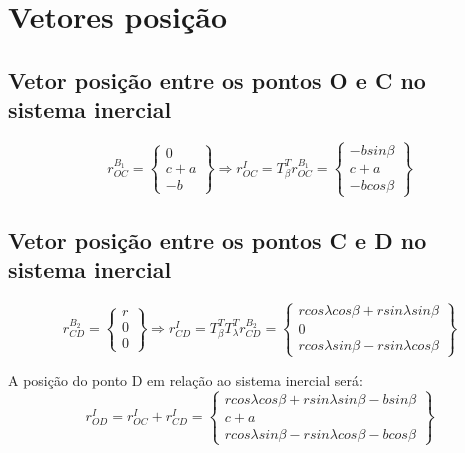 \documentclass[a4paper, 12pt]{article}
\begin{document}
\section{Vetores posição}
	\subsection{Vetor posição entre os pontos O e C no sistema inercial}
		\begin{equation}
			r^{B_1}_{OC} = \begin{Bmatrix}
			0\\
			c + a\\
			-b 
			\end{Bmatrix}
			\Rightarrow
			r^I_{OC} = T_\beta^T r^{B_1}_{OC} = 
			\begin{Bmatrix}
				-bsin\beta\\
				c+a\\
				-bcos\beta
			\end{Bmatrix}
		\end{equation}

	\subsection{Vetor posição entre os pontos C e D no sistema inercial}
		\begin{equation}
			r^{B_2}_{CD} = \begin{Bmatrix}
				r\\
				0\\
				0
			\end{Bmatrix}\Rightarrow 
			r^I_{CD} = T^T_\beta T^T_\lambda r^{B_2}_{CD} = \begin{Bmatrix}
				rcos\lambda cos\beta + rsin \lambda sin \beta\\
				0\\
				r cos \lambda sin \beta - rsin\lambda cos \beta
			\end{Bmatrix}
		\end{equation}

		A posição do ponto D em relação ao sistema inercial será:
		\begin{equation}
			r^I_{OD} = r^I_{OC} + r^I_{CD} = \begin{Bmatrix}
				rcos\lambda cos\beta + rsin \lambda sin \beta -bsin\beta \\
				c+a\\
				r cos \lambda sin \beta - rsin\lambda cos \beta -bcos\beta
			\end{Bmatrix}
		\end{equation}
\end{document}
